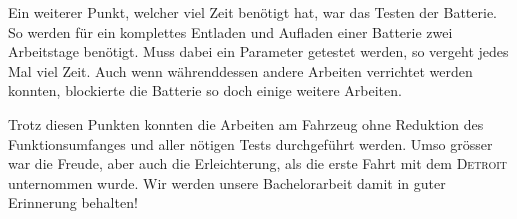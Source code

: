 Ein weiterer Punkt, welcher viel Zeit benötigt hat, war das Testen der Batterie. So werden für ein komplettes Entladen und Aufladen einer Batterie zwei Arbeitstage benötigt. Muss dabei ein Parameter getestet werden, so vergeht jedes Mal viel Zeit. Auch wenn währenddessen andere Arbeiten verrichtet werden konnten, blockierte die Batterie so doch einige weitere Arbeiten.

Trotz diesen Punkten konnten die Arbeiten am Fahrzeug ohne Reduktion des Funktionsumfanges und aller nötigen Tests durchgeführt werden. Umso grösser war die Freude, aber auch die Erleichterung, als die erste Fahrt mit dem \textsc{Detroit} unternommen wurde. Wir werden unsere Bachelorarbeit damit in guter Erinnerung behalten!